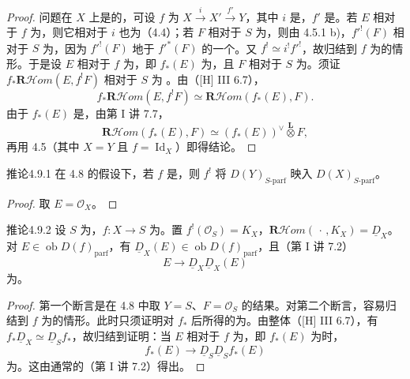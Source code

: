\begin{proof}
问题在 $X$ 上是的，可设 $f$ 为 $X\xrightarrow{i}X'\xrightarrow{f'}Y$，其中 $i$ 是，$f'$ 是。若 $E$ 相对于 $f$ 为，则它相对于 $i$ 也为（4.4）；若 $F$ 相对于 $S$ 为，则由 4.5.1 b)，$f'^!(F)$ 相对于 $S$ 为，因为 $f'^!(F)$ 地于 $f'^*(F)$ 的一个。又 $f^!\simeq i^!f'^!$，故归结到 $f$ 为的情形。于是设 $E$ 相对于 $f$ 为，即 $f_*(E)$ 为，且 $F$ 相对于 $S$ 为。须证 $f_*\mathbf R\mathcal Hom(E,f^!F)$ 相对于 $S$ 为
。由（[H] III 6.7），
\[
f_*\mathbf R\mathcal Hom(E,f^!F)\simeq\mathbf R\mathcal Hom(f_*(E),F).
\]
由于 $f_*(E)$ 是，由第 I 讲 7.7，
\[
\mathbf R\mathcal Hom(f_*(E),F)\simeq(f_*(E))^\vee\mathbin{\overset{\mathbf L}{\otimes}}F,
\]
再用 4.5（其中 $X=Y$ 且 $f=\operatorname{Id}_X$）即得结论。
\end{proof}
\begin{SGAresult}{推论}{4.9.1}
在 4.8 的假设下，若 $f$ 是，则 $f^!$ 将 $D(Y)_{S\text{-}\mathrm{parf}}$ 映入 $D(X)_{S\text{-}\mathrm{parf}}$。
\end{SGAresult}
\begin{proof}取 $E=\mathcal O_X$。
\end{proof}
\begin{SGAresult}{推论}{4.9.2}
设 $S$ 为，$f:X\to S$ 为。置 $f^!(\mathcal O_S)=K_X$，$\mathbf R\mathcal Hom(\,\cdot\,,K_X)=\underline D_X$。对 $E\in\operatorname{ob}D(f)_{\mathrm{parf}}$，有 $\underline D_X(E)\in\operatorname{ob}D(f)_{\mathrm{parf}}$，且（第 I 讲 7.2）
\[
E\longrightarrow\underline D_X\underline D_X(E)
\]
为。
\end{SGAresult}
\begin{proof}
第一个断言是在 4.8 中取 $Y=S$、$F=\mathcal O_S$ 的结果。对第二个断言，容易归结到 $f$ 为的情形。此时只须证明对 $f_*$ 后所得的为。由整体（[H] III 6.7），有 $f_*\underline D_X\simeq\underline D_Sf_*$，故归结到证明：当 $E$ 相对于 $f$ 为，即 $f_*(E)$ 为时，
\[
f_*(E)\longrightarrow\underline D_S\underline D_Sf_*(E)
\]
为。这由通常的（第 I 讲 7.2）得出。
\end{proof}


